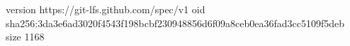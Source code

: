 version https://git-lfs.github.com/spec/v1
oid sha256:3da3e6ad3020f4543f198bcbf230948856d6f09a8ceb0ea36fad3cc5109f5deb
size 1168
